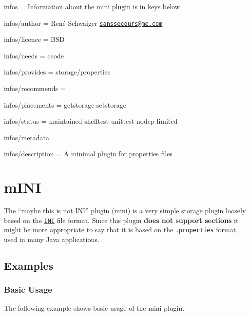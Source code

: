 
\begin{DoxyItemize}
\item infos = Information about the mini plugin is in keys below
\item infos/author = René Schwaiger \href{mailto:sanssecours@me.com}{\tt sanssecours@me.\+com}
\item infos/licence = B\+SD
\item infos/needs = ccode
\item infos/provides = storage/properties
\item infos/recommends =
\item infos/placements = getstorage setstorage
\item infos/status = maintained shelltest unittest nodep limited
\item infos/metadata =
\item infos/description = A minimal plugin for properties files
\end{DoxyItemize}\hypertarget{autotoc_md371_src_plugins_mini_README_md}{}\section{m\+I\+NI}\label{autotoc_md371_src_plugins_mini_README_md}
The “maybe this is not I\+N\+I” plugin ({\ttfamily mini}) is a very simple storage plugin loosely based on the \href{https://en.wikipedia.org/wiki/INI_file}{\tt I\+NI} file format. Since this plugin {\bfseries does not support sections} it might be more appropriate to say that it is based on the \href{https://en.wikipedia.org/wiki/.properties}{\tt .properties} format, used in many Java applications.\hypertarget{autotoc_md371_autotoc_md372}{}\subsection{Examples}\label{autotoc_md371_autotoc_md372}
\hypertarget{autotoc_md371_autotoc_md373}{}\subsubsection{Basic Usage}\label{autotoc_md371_autotoc_md373}
The following example shows basic usage of the {\ttfamily mini} plugin.

